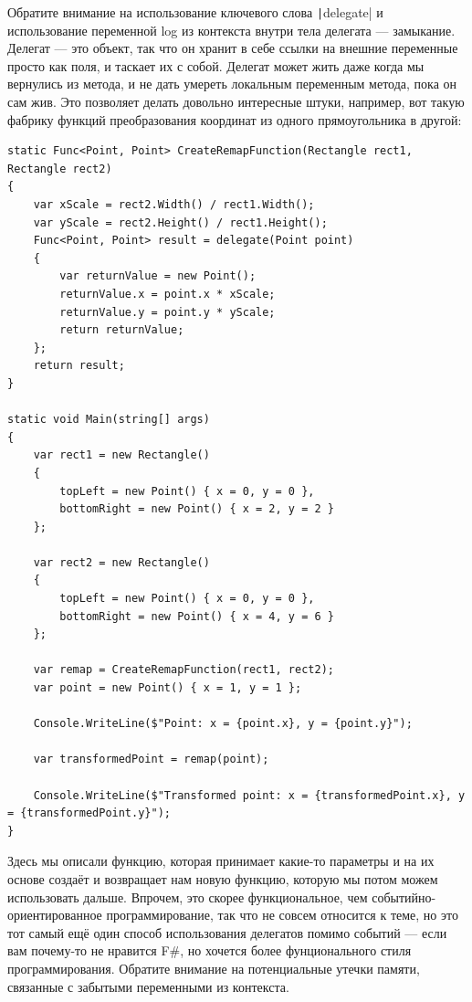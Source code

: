 \documentclass{../../text-style}
\begin{document}
Обратите внимание на использование ключевого слова \texttt|delegate| и использование переменной log из контекста внутри тела делегата --- замыкание. Делегат --- это объект, так что он хранит в себе ссылки на внешние переменные просто как поля, и таскает их с собой. Делегат может жить даже когда мы вернулись из метода, и не дать умереть локальным переменным метода, пока он сам жив. Это позволяет делать довольно интересные штуки, например, вот такую фабрику функций преобразования координат из одного прямоугольника в другой:

\begin{verbatim}
static Func<Point, Point> CreateRemapFunction(Rectangle rect1, Rectangle rect2)
{
    var xScale = rect2.Width() / rect1.Width();
    var yScale = rect2.Height() / rect1.Height();
    Func<Point, Point> result = delegate(Point point)
    {
        var returnValue = new Point();
        returnValue.x = point.x * xScale;
        returnValue.y = point.y * yScale;
        return returnValue;
    };
    return result;
}

static void Main(string[] args)
{
    var rect1 = new Rectangle()
    {
        topLeft = new Point() { x = 0, y = 0 },
        bottomRight = new Point() { x = 2, y = 2 }
    };

    var rect2 = new Rectangle()
    {
        topLeft = new Point() { x = 0, y = 0 },
        bottomRight = new Point() { x = 4, y = 6 }
    };

    var remap = CreateRemapFunction(rect1, rect2);
    var point = new Point() { x = 1, y = 1 };

    Console.WriteLine($"Point: x = {point.x}, y = {point.y}");

    var transformedPoint = remap(point);

    Console.WriteLine($"Transformed point: x = {transformedPoint.x}, y = {transformedPoint.y}");
}
\end{verbatim}

Здесь мы описали функцию, которая принимает какие-то параметры и на их основе создаёт и возвращает нам новую функцию, которую мы потом можем использовать дальше. Впрочем, это скорее функциональное, чем событийно-ориентированное программирование, так что не совсем относится к теме, но это тот самый ещё один способ использования делегатов помимо событий --- если вам почему-то не нравится F\#, но хочется более фунционального стиля программирования. Обратите внимание на потенциальные утечки памяти, связанные с забытыми переменными из контекста.
\end{document}
